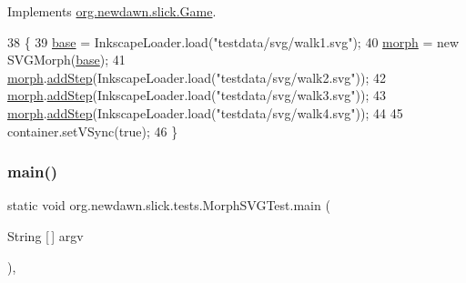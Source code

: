 Implements \mbox{\hyperlink{interfaceorg_1_1newdawn_1_1slick_1_1_game_ad2dd6affab08bb8fdb5fab0815957b7a}{org.\+newdawn.\+slick.\+Game}}.


\begin{DoxyCode}
38                                                                     \{
39         \mbox{\hyperlink{classorg_1_1newdawn_1_1slick_1_1tests_1_1_morph_s_v_g_test_a48bdfb5f5bb3f489b24b8b13df4ff87e}{base}} = InkscapeLoader.load(\textcolor{stringliteral}{"testdata/svg/walk1.svg"});
40         \mbox{\hyperlink{classorg_1_1newdawn_1_1slick_1_1tests_1_1_morph_s_v_g_test_a2690459557274439020ce1df8ecd40e6}{morph}} = \textcolor{keyword}{new} SVGMorph(\mbox{\hyperlink{classorg_1_1newdawn_1_1slick_1_1tests_1_1_morph_s_v_g_test_a48bdfb5f5bb3f489b24b8b13df4ff87e}{base}});
41         \mbox{\hyperlink{classorg_1_1newdawn_1_1slick_1_1tests_1_1_morph_s_v_g_test_a2690459557274439020ce1df8ecd40e6}{morph}}.\mbox{\hyperlink{classorg_1_1newdawn_1_1slick_1_1svg_1_1_s_v_g_morph_ae23a44badfe2dd598ef09d4edfcbfb4d}{addStep}}(InkscapeLoader.load(\textcolor{stringliteral}{"testdata/svg/walk2.svg"}));
42         \mbox{\hyperlink{classorg_1_1newdawn_1_1slick_1_1tests_1_1_morph_s_v_g_test_a2690459557274439020ce1df8ecd40e6}{morph}}.\mbox{\hyperlink{classorg_1_1newdawn_1_1slick_1_1svg_1_1_s_v_g_morph_ae23a44badfe2dd598ef09d4edfcbfb4d}{addStep}}(InkscapeLoader.load(\textcolor{stringliteral}{"testdata/svg/walk3.svg"}));
43         \mbox{\hyperlink{classorg_1_1newdawn_1_1slick_1_1tests_1_1_morph_s_v_g_test_a2690459557274439020ce1df8ecd40e6}{morph}}.\mbox{\hyperlink{classorg_1_1newdawn_1_1slick_1_1svg_1_1_s_v_g_morph_ae23a44badfe2dd598ef09d4edfcbfb4d}{addStep}}(InkscapeLoader.load(\textcolor{stringliteral}{"testdata/svg/walk4.svg"}));
44         
45         container.setVSync(\textcolor{keyword}{true});
46     \}
\end{DoxyCode}
\mbox{\label{classorg_1_1newdawn_1_1slick_1_1tests_1_1_morph_s_v_g_test_a498203e37a3e5da2c98ae929f78ac99d}} 
\subsubsection{\texorpdfstring{main()}{main()}}
{\footnotesize\ttfamily static void org.\+newdawn.\+slick.\+tests.\+Morph\+S\+V\+G\+Test.\+main (\begin{DoxyParamCaption}\item[{String \mbox{[}$\,$\mbox{]}}]{argv }\end{DoxyParamCaption})\hspace{0.3cm}{\ttfamily [inline]}, {\ttfamily [static]}}

